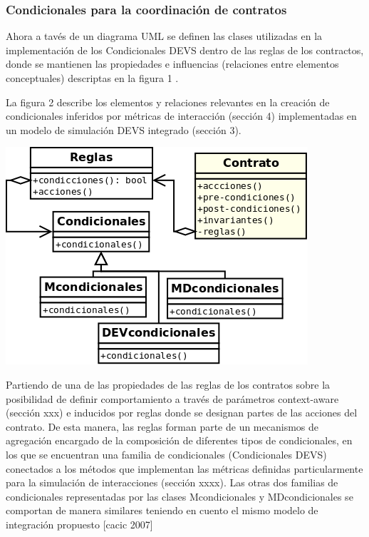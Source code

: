\subsubsection {Condicionales para la coordinación de contratos}

Ahora a tavés de un diagrama UML se definen  las clases utilizadas en la implementación de los Condicionales DEVS dentro de las  reglas de los contractos,   donde se mantienen las propiedades e influencias (relaciones entre elementos conceptuales) descriptas en la figura 1 .

La  figura 2  describe los elementos y relaciones relevantes en la creación de condicionales inferidos por métricas de interacción (sección 4) implementadas en un modelo de simulación DEVS integrado (sección 3). 

\begin{center}
 \includegraphics [width=1\linewidth] {Ch7/DEVSCondicional}
 \label{fig:}
 \
\end{center}

Partiendo de una de las propiedades de las reglas  de los contratos sobre la posibilidad de definir comportamiento a través de parámetros context-aware (sección xxx)  e inducidos por reglas donde se designan partes de las  acciones del contrato. De esta manera, las reglas forman parte de un mecanismos de agregación encargado de la composición de diferentes tipos de condicionales, en los que se encuentran  una
familia de condicionales (Condicionales DEVS) conectados a los métodos que implementan las métricas definidas particularmente para la simulación de interacciones (sección xxxx). Las otras dos familias de condicionales representadas por las clases Mcondicionales y MDcondicionales se comportan de manera similares teniendo en cuento el mismo modelo de integración propuesto [cacic 2007]

